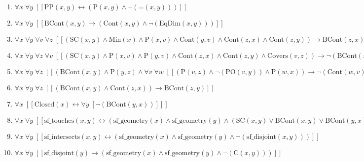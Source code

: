 \documentclass{article}
\begin{document}
\begin{enumerate}
\item $\forall x\; \forall y\;  \left[ \left[ \textrm{PP}(x,y) \leftrightarrow \left(\textrm{P}(x,y) \land \neg \left(\textrm{=}(x,y)\right)\right) \right] \right]$
\item $\forall x\; \forall y\;  \left[ \left[ \textrm{BCont}(x,y) \rightarrow \left(\textrm{Cont}(x,y) \land \neg \left(\textrm{EqDim}(x,y)\right)\right) \right] \right]$
\item $\forall x\; \forall y\; \forall v\; \forall z\;  \left[ \left[ \left(\textrm{SC}(x,y) \land \textrm{Min}(x) \land \textrm{P}(x,v) \land \textrm{Cont}(y,v) \land \textrm{Cont}(z,x) \land \textrm{Cont}(z,y)\right) \rightarrow \textrm{BCont}(z,x) \right] \right]$
\item $\forall x\; \forall y\; \forall z\; \forall v\;  \left[ \left[ \left(\textrm{SC}(x,y) \land \textrm{P}(x,v) \land \textrm{P}(y,v) \land \textrm{Cont}(z,x) \land \textrm{Cont}(z,y) \land \textrm{Covers}(v,z)\right) \rightarrow \neg \left(\textrm{BCont}(z,v)\right) \right] \right]$
\item $\forall x\; \forall y\; \forall z\;  \left[ \left[ \left(\textrm{BCont}(x,y) \land \textrm{P}(y,z) \land \forall v\; \forall w\;  \left[ \left[ \left(\textrm{P}(v,z) \land \neg \left(\textrm{PO}(v,y)\right) \land \textrm{P}(w,x)\right) \rightarrow \neg \left(\textrm{Cont}(w,v)\right) \right] \right]\right) \rightarrow \textrm{BCont}(x,z) \right] \right]$
\item $\forall x\; \forall y\; \forall z\;  \left[ \left[ \left(\textrm{BCont}(x,y) \land \textrm{Cont}(z,x)\right) \rightarrow \textrm{BCont}(z,y) \right] \right]$
\item $\forall x\;  \left[ \left[ \textrm{Closed}(x) \leftrightarrow \forall y\;  \left[ \neg \left(\textrm{BCont}(y,x)\right) \right] \right] \right]$
\item $\forall x\; \forall y\;  \left[ \left[ \textrm{sf\_touches}(x,y) \leftrightarrow \left(\textrm{sf\_geometry}(x) \land \textrm{sf\_geometry}(y) \land \left(\textrm{SC}(x,y) \lor \textrm{BCont}(x,y) \lor \textrm{BCont}(y,x)\right)\right) \right] \right]$
\item $\forall x\; \forall y\;  \left[ \left[ \textrm{sf\_intersects}(x,y) \leftrightarrow \left(\textrm{sf\_geometry}(x) \land \textrm{sf\_geometry}(y) \land \neg \left(\textrm{sf\_disjoint}(x,y)\right)\right) \right] \right]$
\item $\forall x\; \forall y\;  \left[ \left[ \textrm{sf\_disjoint}(y) \rightarrow \left(\textrm{sf\_geometry}(x) \land \textrm{sf\_geometry}(y) \land \neg \left(\textrm{C}(x,y)\right)\right) \right] \right]$
\end{enumerate}
\end{document}
